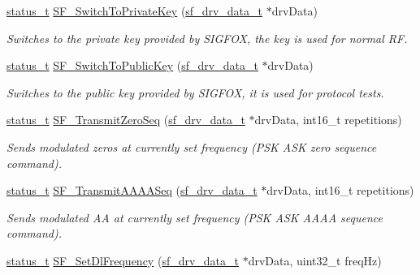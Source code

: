 \begin{DoxyCompactItemize}
\mbox{\hyperlink{group__ksdk__common_gaaabdaf7ee58ca7269bd4bf24efcde092}{status\+\_\+t}} \mbox{\hyperlink{group__sf__functions__group_ga2901646dfa48cb95c2dca7f7459b64b0}{S\+F\+\_\+\+Switch\+To\+Private\+Key}} (\mbox{\hyperlink{structsf__drv__data__t}{sf\+\_\+drv\+\_\+data\+\_\+t}} $\ast$drv\+Data)
\begin{DoxyCompactList}\small\item\em Switches to the private key provided by S\+I\+G\+F\+OX, the key is used for normal RF. \end{DoxyCompactList}\item 
\mbox{\hyperlink{group__ksdk__common_gaaabdaf7ee58ca7269bd4bf24efcde092}{status\+\_\+t}} \mbox{\hyperlink{group__sf__functions__group_gacc6d9bcb60d775ccb2d3739b5d41eb96}{S\+F\+\_\+\+Switch\+To\+Public\+Key}} (\mbox{\hyperlink{structsf__drv__data__t}{sf\+\_\+drv\+\_\+data\+\_\+t}} $\ast$drv\+Data)
\begin{DoxyCompactList}\small\item\em Switches to the public key provided by S\+I\+G\+F\+OX, it is used for protocol tests. \end{DoxyCompactList}\item 
\mbox{\hyperlink{group__ksdk__common_gaaabdaf7ee58ca7269bd4bf24efcde092}{status\+\_\+t}} \mbox{\hyperlink{group__sf__functions__group_gaa6162b63ca5d9cc56c054ea2bddac1f2}{S\+F\+\_\+\+Transmit\+Zero\+Seq}} (\mbox{\hyperlink{structsf__drv__data__t}{sf\+\_\+drv\+\_\+data\+\_\+t}} $\ast$drv\+Data, int16\+\_\+t repetitions)
\begin{DoxyCompactList}\small\item\em Sends modulated zeros at currently set frequency (P\+SK A\+SK zero sequence command). \end{DoxyCompactList}\item 
\mbox{\hyperlink{group__ksdk__common_gaaabdaf7ee58ca7269bd4bf24efcde092}{status\+\_\+t}} \mbox{\hyperlink{group__sf__functions__group_ga1ba2a22d2c43f1be64c8946e0f8e4d4f}{S\+F\+\_\+\+Transmit\+A\+A\+A\+A\+Seq}} (\mbox{\hyperlink{structsf__drv__data__t}{sf\+\_\+drv\+\_\+data\+\_\+t}} $\ast$drv\+Data, int16\+\_\+t repetitions)
\begin{DoxyCompactList}\small\item\em Sends modulated AA at currently set frequency (P\+SK A\+SK A\+A\+AA sequence command). \end{DoxyCompactList}\item 
\mbox{\hyperlink{group__ksdk__common_gaaabdaf7ee58ca7269bd4bf24efcde092}{status\+\_\+t}} \mbox{\hyperlink{group__sf__functions__group_ga74dd3f84beaf121c2004bb457cdc88be}{S\+F\+\_\+\+Set\+Dl\+Frequency}} (\mbox{\hyperlink{structsf__drv__data__t}{sf\+\_\+drv\+\_\+data\+\_\+t}} $\ast$drv\+Data, uint32\+\_\+t freq\+Hz)

\end{DoxyCompactItemize}
